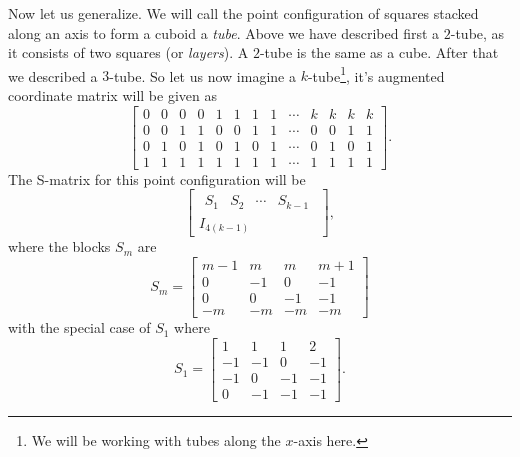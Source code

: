 \documentclass[a4paper,12pt]{book}
\theoremstyle{plain}
\theoremstyle{definition}
\begin{document}
Now let us generalize. We will call the point
configuration of squares stacked along an axis to form
a cuboid a \emph{tube}. Above we have described first a \( 2 \)-tube, as it consists of two squares
(or \emph{layers}). A \( 2 \)-tube is the same as a cube.
After that we described a \( 3 \)-tube. So let us
now imagine a
\( k \)-tube\footnote{We will be working with tubes along the \( x \)-axis here.}, it's
augmented coordinate matrix will be given as
\[
\begin{bmatrix}
	0 & 0 & 0 & 0 & 1 & 1 & 1 & 1 & \cdots & k & k & k & k \\
	0 & 0 & 1 & 1 & 0 & 0 & 1 & 1 & \cdots & 0 & 0 & 1 & 1 \\
	0 & 1 & 0 & 1 & 0 & 1 & 0 & 1 & \cdots & 0 & 1 & 0 & 1 \\
	1 & 1 & 1 & 1 & 1 & 1 & 1 & 1 & \cdots & 1 & 1 & 1 & 1
\end{bmatrix}.
\]
The S-matrix for this point configuration will be
\[
	\begin{bmatrix}
		\begin{matrix}
			S_1 & S_2 & \cdots & S_{k-1}			
		\end{matrix} \\
		I_{4(k-1)}
	\end{bmatrix},
\]
where the blocks \( S_m \) are
\[
	S_m = \begin{bmatrix}
		m-1 & m & m & m+1 \\
		0 & -1 & 0 & -1 \\
		0 & 0 & -1 & -1 \\
		-m & -m & -m & -m
	\end{bmatrix}
\]
with the special case of \( S_1 \) where
\[
	S_1 = \begin{bmatrix}
		1 & 1 & 1 & 2 \\
		-1 & -1 & 0 & -1 \\
		-1 & 0 & -1 & -1 \\
		0 & -1 & -1 & -1
	\end{bmatrix}.
\]
\end{document}

